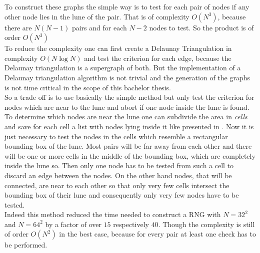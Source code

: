     To construct these graphs the simple way is to test for each
    pair of nodes if any other node lies in
    the lune of the pair. That is of complexity \(O (N^3)\), because
    there are \(N(N-1)\) pairs and for each \(N-2\) nodes to test. So
    the product is of order \(O(N^3)\)\\
    To reduce the complexity one can first create a Delaunay
    Triangulation in complexity \(O (N \log N)\)
    \cite{RNGCell} and test the criterion for each edge, because
    the Delaunay triangulation is a supergraph of both. But the
    implementation of a Delaunay triangulation algorithm is not trivial
    and the generation of the graphs is not time critical in the scope
    of this bachelor thesis.\\
    So a trade off is to use basically the simple method but only test
    the criterion for nodes which are near to the lune and abort if
    one node inside the lune is found. To determine which nodes are
    near the lune one can subdivide the area in \emph{cells} and save
    for each cell a list with nodes lying inside it like presented in
    \cite{RNGCell}.
    Now it is just necessary to test the nodes in the cells which
    resemble a rectangular bounding box of the lune. Most pairs will be
    far away from each other and there will be one or more cells in the
    middle of the bounding box, which are completely inside the lune so.
    Then only one node has to be tested from such a cell to discard an
    edge between the nodes. On the other hand nodes, that will be connected,
    are near to each other so that only very few cells intersect the bounding
    box of their lune and consequently only very few nodes have to be tested.\\
    Indeed this method reduced the time needed to construct a RNG with
    \(N=32^2\) and \(N=64^2\) by a factor of
    over \(15\) respectively \(40\). Though the complexity is still of
    order \(O(N^2)\) in the best case, because for every pair at least
    one check has to be performed.
